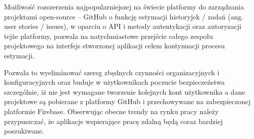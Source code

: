Możliwość rozszerzenia najpopularniejszej na świecie platformy do zarządzania projektami open-source – GitHub o funkcję estymacji historyjek / zadań (ang. user stories / issues),
w oparciu o API i metody autentykacji oraz autoryzacji tejże platformy,
pozwala na natychmiastowe przejście całego zespołu projektowego na interfejs stworzonej aplikacji celem kontynuacji procesu estymacji.

Pozwala to wyeliminować szereg zbędnych czynności organizacyjnych i konfiguracyjnych oraz buduje w użytkownikach poczucie bezpieczeństwa szczególnie,
iż nie jest wymagane tworzenie kolejnych kont użytkownika a dane projektowe są pobierane z platformy GitHub i przechowywane na zabezpieczonej platformie Firebase.
Obserwując obecne trendy na rynku pracy\cite{www_rozproszony} należy przypuszczać, że aplikacje wspierające pracę zdalną będą coraz bardziej poszukiwane.